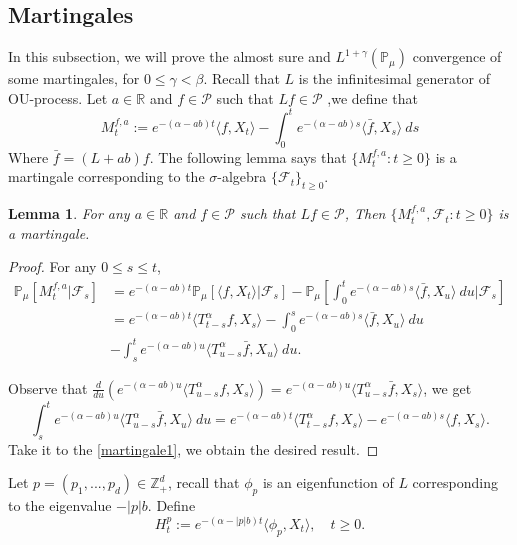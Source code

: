 \documentclass[12pt, a4paper]{amsart}
\newtheorem{lem}[thm]{Lemma}
\theoremstyle{definition}
\numberwithin{equation}{section}
\begin{document}
\subsection{Martingales}

In this subsection, we will prove the almost sure and $L^{1+\gamma}(\mathbb{P}_{\mu})$ convergence of some martingales, for $0\leq\gamma<\beta$. Recall that $L$ is the infinitesimal generator of OU-process. Let $a\in \mathbb{R}$ and $f\in \mathcal{P}$ such that $Lf \in \mathcal{P}$ ,we define that
$$M_t^{f,a}:=e^{-(\alpha-ab)t}\langle f,X_t\rangle-\int_0^t e^{-(\alpha-ab)s}\langle \bar{f}, X_s\rangle~ ds$$
Where $\bar{f}=(L+ab)f$. The following lemma says that $\{M_t^{f,a}: t\geq 0\}$ is a martingale corresponding to the $\sigma$-algebra $\{\mathcal{F}_t\}_{t\geq 0}$.
\begin{lem}\label{lemma25}
For any $a \in \mathbb{R}$ and $f\in\mathcal{P}$ such that $L f\in\mathcal{P}$, Then $\{M_t^{f,a},\mathcal{F}_t:t\geq 0\}$ is a martingale.
\end{lem}

\begin{proof} 
For any $0\leq s\leq t$,
\begin{align}
    \mathbb{P}_{\mu}\left[M_t^{f,a}|\mathcal{F}_s\right] &=e^{-(\alpha-ab)t}\mathbb{P}_{\mu}\left[\langle f,X_t\rangle|\mathcal{F}_s\right]-\mathbb{P}_{\mu}\left[\int_0^t e^{-(\alpha-ab)s}\langle \bar{f}, X_u\rangle~ du|\mathcal{F}_s\right]\nonumber\\
    &=e^{-(\alpha-ab)t}\langle T_{t-s}^{\alpha}f, X_s\rangle-\int_0^s e^{-(\alpha-ab)s}\langle \bar{f}, X_u\rangle~ du\nonumber\\
    &-\int_s^t e^{-(\alpha-ab)u}\langle T_{u-s}^{\alpha} \bar{f},X_u\rangle~ du.\label{martingale1}
\end{align}

Observe that $\frac{d}{du}\left(e^{-(\alpha-ab)u}\langle T_{u-s}^{\alpha}f,X_s\rangle\right)=e^{-(\alpha-ab)u}\langle T_{u-s}^{\alpha}\bar{f},X_s\rangle$, we get
$$\int_s^t e^{-(\alpha-ab)u}\langle T_{u-s}^{\alpha} \bar{f},X_u\rangle~ du=e^{-(\alpha-ab)t}\langle T_{t-s}^{\alpha}f,X_s\rangle-e^{-(\alpha-ab)s}\langle f,X_s\rangle.$$
Take it to the \eqref{martingale1}, we obtain the desired result.
\end{proof}

Let $p=(p_1,...,p_d)\in \mathbb{Z}_+^d$, recall that $\phi_p$ is an eigenfunction of $L$ corresponding to the eigenvalue $-|p|b$. Define
$$H_t^p:=e^{-(\alpha-|p|b)t}\langle\phi_p,X_t\rangle, \quad t\geq 0.$$
\end{document}
